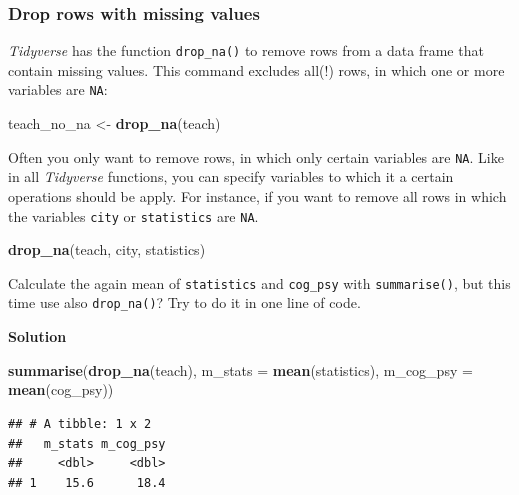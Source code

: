 \documentclass[
]{scrartcl}
\makeatletter
\newenvironment{Shaded}{\begin{snugshade}}{\end{snugshade}}
\newcommand{\AttributeTok}[1]{\textcolor[rgb]{0.13,0.29,0.53}{#1}}
\newcommand{\FunctionTok}[1]{\textcolor[rgb]{0.13,0.29,0.53}{\textbf{#1}}}
\newcommand{\NormalTok}[1]{#1}
\newcommand{\OtherTok}[1]{\textcolor[rgb]{0.56,0.35,0.01}{#1}}
\newenvironment{kframe}{%
\medskip{}
\setlength{\fboxsep}{.8em}
 \def\at@end@of@kframe{}%
 \ifinner\ifhmode%
  \def\at@end@of@kframe{\end{minipage}}%
  \begin{minipage}{\columnwidth}%
 \fi\fi%
 \def\FrameCommand##1{\hskip\@totalleftmargin \hskip-\fboxsep
 \colorbox{shadecolor}{##1}\hskip-\fboxsep
     \hskip-\linewidth \hskip-\@totalleftmargin \hskip\columnwidth}%
 \MakeFramed {\advance\hsize-\width
   \@totalleftmargin\z@ \linewidth\hsize
   \@setminipage}}%
 {\par\unskip\endMakeFramed%
 \at@end@of@kframe}
\newenvironment{rmdblock}[1]
  {
  \begin{itemize}
  \renewcommand{\labelitemi}{
    \raisebox{-.7\height}[0pt][0pt]{
      {\setkeys{Gin}{width=3em,keepaspectratio}\texttt{[image: images/\#1]}}
    }
  }
  \setlength{\fboxsep}{1em}
  \begin{kframe}
  \item
  }
  {
  \end{kframe}
  \end{itemize}
  }
\newenvironment{myexercise}
    {\begin{rmdblock}{exercise_green}}
    {\end{rmdblock}}
\newenvironment{webexsolution}[1]
    {\par\tiny\textbf{#1}}
    {\par}
\newcommand{\webexhide}[1]{\begin{webexsolution}{#1}}
\makeatother
\begin{document}
\subsubsection{Drop rows with missing values}\label{drop-rows-with-missing-values}

\emph{Tidyverse} has the function \texttt{drop\_na()} to remove rows from a data frame that contain missing values. This command excludes all(!) rows, in which one or more variables are \texttt{NA}:

\begin{Shaded}
\begin{Highlighting}[]
\NormalTok{teach\_no\_na }\OtherTok{\textless{}{-}} \FunctionTok{drop\_na}\NormalTok{(teach)}
\end{Highlighting}
\end{Shaded}

Often you only want to remove rows, in which only certain variables are \texttt{NA}. Like in all \emph{Tidyverse} functions, you can specify variables to which it a certain operations should be apply. For instance, if you want to remove all rows in which the variables \texttt{city} or \texttt{statistics} are \texttt{NA}.

\begin{Shaded}
\begin{Highlighting}[]
\FunctionTok{drop\_na}\NormalTok{(teach, city, statistics)}
\end{Highlighting}
\end{Shaded}

\begin{myexercise}
Calculate the again mean of \texttt{statistics} and \texttt{cog\_psy}
with \texttt{summarise()}, but this time use also \texttt{drop\_na()}?
Try to do it in one line of code.
\end{myexercise}
\webexhide{Solution}

\begin{Shaded}
\begin{Highlighting}[]
\FunctionTok{summarise}\NormalTok{(}\FunctionTok{drop\_na}\NormalTok{(teach), }\AttributeTok{m\_stats =} \FunctionTok{mean}\NormalTok{(statistics),}
          \AttributeTok{m\_cog\_psy =} \FunctionTok{mean}\NormalTok{(cog\_psy))}
\end{Highlighting}
\end{Shaded}

\begin{verbatim}
## # A tibble: 1 x 2
##   m_stats m_cog_psy
##     <dbl>     <dbl>
## 1    15.6      18.4
\end{verbatim}
\end{document}
